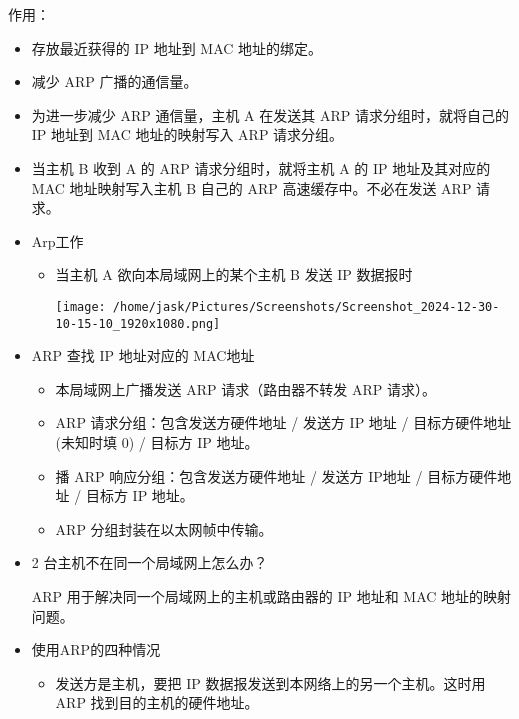 \documentclass[11pt]{article}
\begin{document}
\begin{enumerate}
\begin{itemize}
作用：
\begin{itemize}
\item 存放最近获得的 IP 地址到 MAC 地址的绑定。

\item 减少 ARP 广播的通信量。

\item 为进一步减少 ARP 通信量，主机 A 在发送其 ARP 请求分组时，就将自己的 IP 地址到 MAC 地址的映射写入 ARP 请求分组。

\item 当主机 B 收到 A 的 ARP 请求分组时，就将主机 A 的 IP 地址及其对应的 MAC 地址映射写入主机 B 自己的 ARP 高速缓存中。不必在发送 ARP 请求。
\end{itemize}
\end{itemize}


\begin{itemize}
\item Arp工作
\begin{itemize}
\item 当主机 A 欲向本局域网上的某个主机 B 发送 IP 数据报时
\begin{center}
\texttt{[image: /home/jask/Pictures/Screenshots/Screenshot\_2024-12-30-10-15-10\_1920x1080.png]}
\end{center}
\end{itemize}

\item ARP 查找 IP 地址对应的 MAC地址

\begin{itemize}
\item 本局域网上广播发送 ARP 请求（路由器不转发 ARP 请求）。

\item ARP 请求分组：包含发送方硬件地址 / 发送方 IP 地址 / 目标方硬件地址(未知时填 0) / 目标方 IP 地址。

\item 播 ARP 响应分组：包含发送方硬件地址 / 发送方 IP地址 / 目标方硬件地址 / 目标方 IP 地址。

\item ARP 分组封装在以太网帧中传输。
\end{itemize}

\item 2 台主机不在同一个局域网上怎么办？

ARP 用于解决同一个局域网上的主机或路由器的 IP 地址和 MAC 地址的映射问题。

\item 使用ARP的四种情况
\begin{itemize}
\item 发送方是主机，要把 IP 数据报发送到本网络上的另一个主机。这时用 ARP 找到目的主机的硬件地址。


\end{itemize}
\end{itemize}
\end{enumerate}
\end{document}

